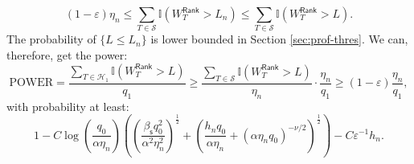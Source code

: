 \documentclass[12pt]{article}
\newcommand{\cH}{\mathcal{H}}
\newcommand{\cS}{\mathcal{S}}
\newcommand{\bbI}{\mathbb{I}}
\theoremstyle{plain}
\begin{document}
\begin{equation*}
  (1-\varepsilon)\eta_n \le   \sum\limits_{T\in\cS} \bbI(W_T^\mathsf{Rank}> L_n) \le \sum\limits_{T\in\cS} \bbI(W_T^\mathsf{Rank}> L).
\end{equation*}
The probability of $\{L\le L_n\}$ is lower bounded in Section \ref{sec:prof-thres}. We can, therefore, get the power:
\begin{equation*}
    \text{POWER}= \frac{\sum\limits_{T\in\cH_1} \bbI(W_T^\mathsf{Rank}> L)}{q_1}\ge \frac{\sum\limits_{T\in\cS} \bbI(W_T^\mathsf{Rank}> L)}{\eta_n} \cdot \frac{\eta_n}{q_1}\ge (1-\varepsilon)\frac{\eta_n}{q_1},
\end{equation*}
with probability at least:
\begin{equation*}
      1-C \log(\frac{q_0 }{\alpha \eta_n})\left( \left(\frac{\beta_{\mathsf{s}} q_0^2 }{ \alpha^2\eta_n^2}\right)^{\frac{1}{2}} + \left(\frac{h_n q_0}{\alpha \eta_n}+(\alpha\eta_n q_0)^{-\nu/2} \right)^{\frac{1}{2}}\right)- C \varepsilon^{-1} h_n.
\end{equation*}
\end{document}
